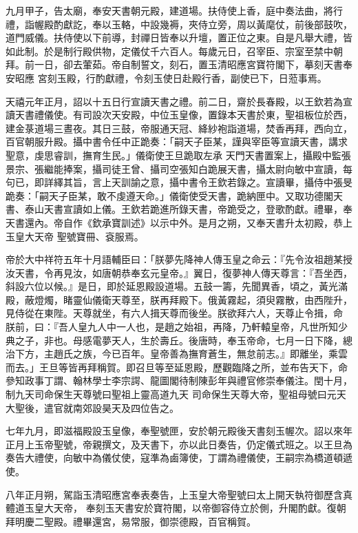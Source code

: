 \begin{pinyinscope}
 九月甲子，告太廟，奉安天書朝元殿，建道場。扶侍使上香，庭中奏法曲，將行禮，詣幄殿酌獻訖，奉以玉輅，中設幾褥，夾侍立旁，周以黃麾仗，前後部鼓吹，道門威儀。扶侍使以下前導，封禪日皆奉以升壇，置正位之東。自是凡舉大禮，皆如此制。於是制行殿供物，定儀仗千六百人。每歲元日，召宰臣、宗室至禁中朝拜。前一日，卻去葷茹。帝自制誓文，刻石，置玉清昭應宮寶符閣下，摹刻天書奉安昭應
 宮刻玉殿，行酌獻禮，令刻玉使日赴殿行香，副使已下，日蒞事焉。



 天禧元年正月，詔以十五日行宣讀天書之禮。前二日，齋於長春殿，以王欽若為宣讀天書禮儀使。有司設次天安殿，中位玉皇像，置錄本天書於東，聖祖板位於西，建金菉道場三晝夜。其日三鼓，帝服通天冠、絳紗袍詣道場，焚香再拜，西向立，百官朝服升殿。攝中書令任中正跪奏：「嗣天子臣某，謹與宰臣等宣讀天書，講求聖意，虔思睿訓，撫育生民。」儀衛使王旦跪取左承
 天門天書置案上，攝殿中監張景宗、張繼能捧案，攝司徒王曾、攝司空張知白跪展天書，攝太尉向敏中宣讀，每句已，即詳繹其旨，言上天訓諭之意，攝中書令王欽若錄之。宣讀畢，攝侍中張旻跪奏：「嗣天子臣某，敢不虔遵天命。」儀衛使受天書，跪納匣中。又取功德閣天書、泰山天書宣讀如上儀。王欽若跪進所錄天書，帝跪受之，登歌酌獻。禮畢，奉天書還內。帝自作《欽承寶訓述》以示中外。是月之朔，又奉天書升太初殿，恭上玉皇大天帝
 聖號寶冊、袞服焉。



 帝於大中祥符五年十月語輔臣曰：「朕夢先降神人傳玉皇之命云：『先令汝祖趙某授汝天書，令再見汝，如唐朝恭奉玄元皇帝。』翼日，復夢神人傳天尊言：『吾坐西，斜設六位以候。』是日，即於延恩殿設道場。五鼓一籌，先聞異香，頃之，黃光滿殿，蔽燈燭，睹靈仙儀衛天尊至，朕再拜殿下。俄黃霧起，須臾霧散，由西陛升，見侍從在東陛。天尊就坐，有六人揖天尊而後坐。朕欲拜六人，天尊止令揖，命
 朕前，曰：『吾人皇九人中一人也，是趙之始祖，再降，乃軒轅皇帝，凡世所知少典之子，非也。母感電夢天人，生於壽丘。後唐時，奉玉帝命，七月一日下降，總治下方，主趙氏之族，今已百年。皇帝善為撫育蒼生，無怠前志。』即離坐，乘雲而去。」王旦等皆再拜稱賀。即召旦等至延恩殿，歷觀臨降之所，並布告天下，命參知政事丁謂、翰林學士李宗諤、龍圖閣待制陳彭年與禮官修崇奉儀注。閏十月，制九天司命保生天尊號曰聖祖上靈高道九天
 司命保生天尊大帝，聖祖母號曰元天大聖後，遣官就南郊設昊天及四位告之。



 七年九月，即滋福殿設玉皇像，奉聖號匣，安於朝元殿後天書刻玉幄次。詔以來年正月上玉帝聖號，帝親撰文，及天書下，亦以此日奏告，仍定儀式班之。以王旦為奏告大禮使，向敏中為儀仗使，寇準為鹵簿使，丁謂為禮儀使，王嗣宗為橋道頓遞使。



 八年正月朔，駕詣玉清昭應宮奉表奏告，上玉皇大帝聖號曰太上開天執符御歷含真體道玉皇大天帝，
 奉刻玉天書安於寶符閣，以帝御容侍立於側，升閣酌獻。復朝拜明慶二聖殿。禮畢還宮，易常服，御崇德殿，百官稱賀。




\end{pinyinscope}
